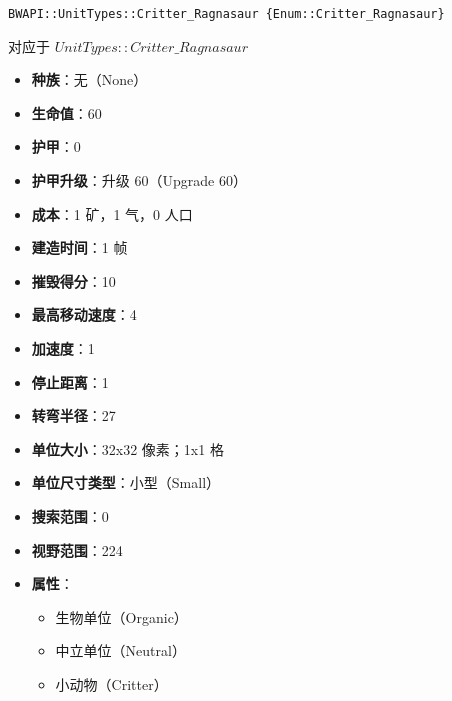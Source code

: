 \begin{tcolorbox}[colback=white, colframe=black!60!white, title=Critter\_Ragnasaur(), arc=0mm]
    \begin{verbatim}
BWAPI::UnitTypes::Critter_Ragnasaur {Enum::Critter_Ragnasaur}
    \end{verbatim}
    对应于  $UnitTypes::Critter\_Ragnasaur$ 
    \begin{itemize}
        \item \textbf{种族}：无（None）
        \item \textbf{生命值}：60
        \item \textbf{护甲}：0
        \item \textbf{护甲升级}：升级 60（Upgrade 60）
        \item \textbf{成本}：1 矿，1 气，0 人口
        \item \textbf{建造时间}：1 帧
        \item \textbf{摧毁得分}：10
        \item \textbf{最高移动速度}：4
        \item \textbf{加速度}：1
        \item \textbf{停止距离}：1
        \item \textbf{转弯半径}：27
        \item \textbf{单位大小}：32x32 像素；1x1 格
        \item \textbf{单位尺寸类型}：小型（Small）
        \item \textbf{搜索范围}：0
        \item \textbf{视野范围}：224
        \item \textbf{属性}：
            \begin{itemize}
                \item 生物单位（Organic）
                \item 中立单位（Neutral）
                \item 小动物（Critter）
            \end{itemize}
    \end{itemize}
\end{tcolorbox}

